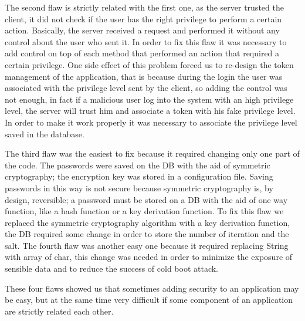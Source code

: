 The second flaw is strictly related with the first one, as the server trusted the client, it did not check if the user has the right privilege to perform a certain action.\newline
Basically, the server received a request and performed it without any control about the user who sent it.\newline
In order to fix this flaw it was necessary to add control on top of each method that performed an action that required a certain privilege.\newline
One side effect of this problem forced us to re-design the token management of the application, that is because during the login the user was associated with the privilege level sent by the client, so adding the control was not enough, in fact if a malicious user log into the system with an high privilege level, the server will trust him and associate a token with his fake privilege level.\newline
In order to make it work properly it was necessary to associate the privilege level saved in the database.\newline

The third flaw was the easiest to fix because it required changing only one part of the code.\newline
The passwords were saved on the DB with the aid of symmetric cryptography; the encryption key was stored in a configuration file.\newline
Saving passwords in this way is not secure because symmetric cryptography is, by design, reversible; a password must be stored on a DB with the aid of one way function, like a hash function or a key derivation function.\newline
To fix this flaw we replaced the symmetric cryptography algorithm with a key derivation function, the DB required some change in order to store the number of iteration and the salt.\newline
The fourth flaw was another easy one because it required replacing String with array of char, this change was needed in order to minimize the exposure of sensible data and to reduce the success of cold boot attack.\newline

These four flaws showed us that sometimes adding security to an application may be easy, but at the same time very difficult if some component of an application are strictly related each other.

